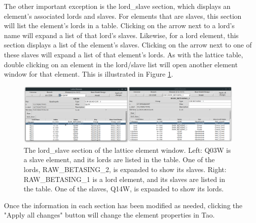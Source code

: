 The other important exception is the lord_slave section, which displays an element's associated lords and slaves.
For elements that are slaves, this section will list the element's lords in a table.
Clicking on the arrow next to a lord's name will expand a list of that lord's slaves.
Likewise, for a lord element, this section displays a list of the element's slaves.
Clicking on the arrow next to one of these slaves will expand a list of that element's lords.
As with the lattice table, double clicking on an element in the lord/slave list will open another element window for that element.
This is illustrated in Figure \ref{fig:gui.lat.element.lordslave}.
\begin{figure}
\centering
\includegraphics[width=12cm]{figures/lat_lord_slave.png}
\caption{The lord_slave section of the lattice element window.
Left: Q03W is a slave element, and its lords are listed in the table.
One of the lords, RAW_BETASING_2, is expanded to show its slaves.
Right: RAW_BETASING_1 is a lord element, and its slaves are listed in the table.
One of the slaves, Q14W, is expanded to show its lords.}
\label{fig:gui.lat.element.lordslave}
\end{figure}

Once the information in each section has been modified as needed, clicking the "Apply all changes" button will change the element properties in Tao.
